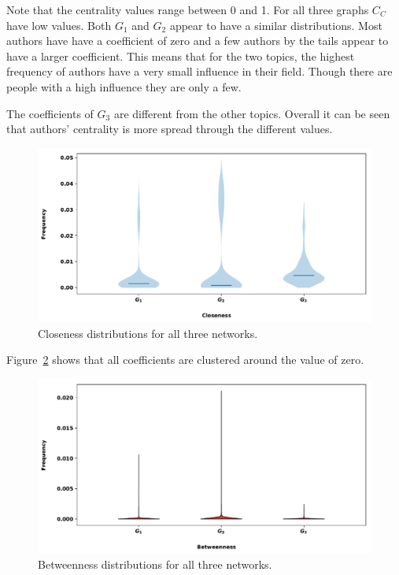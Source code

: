 \documentclass{article}
\theoremstyle{definition}
\begin{document}
Note that the centrality values range between 0 and 1. For all three graphs \(C_C\)
have low values. Both \(G_1\) and \(G_2\) appear to have a similar distributions.
Most authors have have a coefficient of zero and a few authors by the tails
appear to have a larger coefficient. This means that for the two topics, the highest
frequency of authors have a very small influence in their field. Though there 
are people with a high influence they are only a few.

The coefficients of \(G_3\) are different from the other topics. Overall it
can be seen that authors' centrality is more spread through the different values.

\begin{figure}[!hbtp]
    \centering
    \includegraphics[width=.8\textwidth]{./assets/images/Closeness_histrograms.pdf}
    \caption{Closeness distributions for all three networks.}\label{fig:closeness_dist}
\end{figure}

Figure~\ref{fig:closeness_dist} shows that all coefficients are clustered around the value of zero.

\begin{center}
\begin{figure}[!hbtp]
    \centering
    \includegraphics[width=.8\textwidth]{./assets/images/Betweenness_histrograms.pdf}
    \caption{Betweenness distributions for all three networks.}\label{fig:closeness_dist}
\end{figure}
\end{center}
\end{document}
